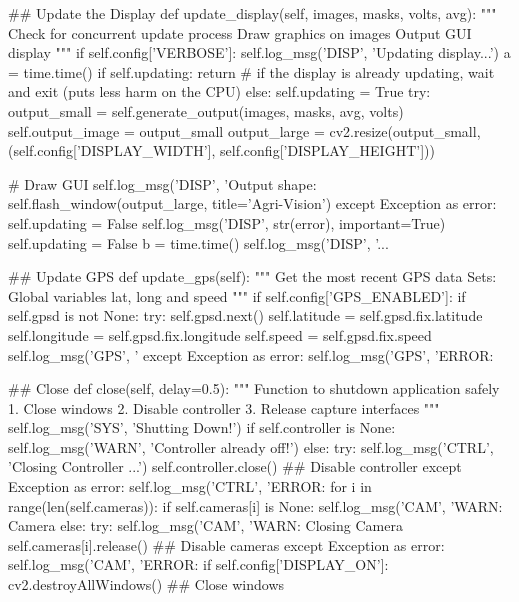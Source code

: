\begin{python}
    ## Update the Display
    def update_display(self, images, masks, volts, avg):
        """
        Check for concurrent update process
        Draw graphics on images
        Output GUI display
        """
        if self.config['VERBOSE']: self.log_msg('DISP', 'Updating display...')
        a = time.time()
        if self.updating:
            return # if the display is already updating, wait and exit (puts less harm on the CPU)
        else:
            self.updating = True
            try:
                output_small = self.generate_output(images, masks, avg, volts)
                self.output_image = output_small
                output_large = cv2.resize(output_small, (self.config['DISPLAY_WIDTH'], self.config['DISPLAY_HEIGHT']))

                # Draw GUI
                self.log_msg('DISP', 'Output shape: %
                self.flash_window(output_large, title='Agri-Vision')
            except Exception as error:
                self.updating = False
                self.log_msg('DISP', str(error), important=True)
            self.updating = False
        b = time.time()
        self.log_msg('DISP', '... %
                    
    ## Update GPS
    def update_gps(self):
        """
        Get the most recent GPS data
        Sets: Global variables lat, long and speed
        """
        if self.config['GPS_ENABLED']:
            if self.gpsd is not None:
                try:
                    self.gpsd.next()
                    self.latitude = self.gpsd.fix.latitude
                    self.longitude = self.gpsd.fix.longitude
                    self.speed = self.gpsd.fix.speed
                    self.log_msg('GPS', '%
                except Exception as error:
                    self.log_msg('GPS', 'ERROR: %
    
    ## Close
    def close(self, delay=0.5):
        """
        Function to shutdown application safely
        1. Close windows
        2. Disable controller
        3. Release capture interfaces 
        """
        self.log_msg('SYS', 'Shutting Down!')
        if self.controller is None:
            self.log_msg('WARN', 'Controller already off!')
        else:
            try:
                self.log_msg('CTRL', 'Closing Controller ...')
                self.controller.close() ## Disable controller
            except Exception as error:
                self.log_msg('CTRL', 'ERROR: %
        for i in range(len(self.cameras)):
            if self.cameras[i] is None:
                self.log_msg('CAM', 'WARN: Camera %
            else:
                try:
                    self.log_msg('CAM', 'WARN: Closing Camera %
                    self.cameras[i].release() ## Disable cameras
                except Exception as error:
                    self.log_msg('CAM', 'ERROR: %
        if self.config['DISPLAY_ON']:
            cv2.destroyAllWindows() ## Close windows
  

\end{python}
